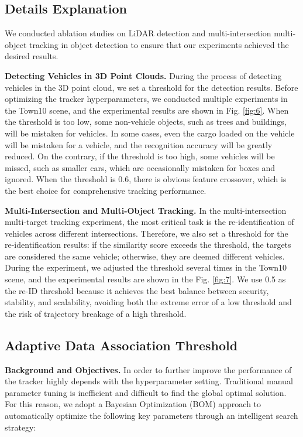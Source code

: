 \documentclass[lettersize,journal]{IEEEtran}
\begin{document}
\subsection{Details Explanation}

We conducted ablation studies on LiDAR detection and multi-intersection multi-object tracking in object detection to ensure that our experiments achieved the desired results.

\textbf{Detecting Vehicles in 3D Point Clouds.}
During the process of detecting vehicles in the 3D point cloud, we set a threshold for the detection results.
Before optimizing the tracker hyperparameters, we conducted multiple experiments in the Town10 scene, and the experimental results are shown in Fig. \ref{fig:6}.
When the threshold is too low, some non-vehicle objects, such as trees and buildings, will be mistaken for vehicles. In some cases, even the cargo loaded on the vehicle will be mistaken for a vehicle, and the recognition accuracy will be greatly reduced.
On the contrary, if the threshold is too high, some vehicles will be missed, such as smaller cars, which are occasionally mistaken for boxes and ignored.
When the threshold is 0.6, there is obvious feature crossover, which is the best choice for comprehensive tracking performance.

\textbf{Multi-Intersection and Multi-Object Tracking.}
In the multi-intersection multi-target tracking experiment, the most critical task is the re-identification of vehicles across different intersections. 
Therefore, we also set a threshold for the re-identification results: if the similarity score exceeds the threshold, the targets are considered the same vehicle; otherwise, they are deemed different vehicles. 
During the experiment, we adjusted the threshold several times in the Town10 scene, and the experimental results are shown in the Fig. \ref{fig:7}.
We use 0.5 as the re-ID threshold because it achieves the best balance between security, stability, and scalability, avoiding both the extreme error of a low threshold and the risk of trajectory breakage of a high threshold.

\subsection{Adaptive Data Association Threshold}

\textbf{Background and Objectives.}
In order to further improve the performance of the tracker highly depends with the hyperparameter setting. 
Traditional manual parameter tuning is inefficient and difficult to find the global optimal solution. 
For this reason, we adopt a Bayesian Optimization (BOM) approach to automatically optimize the following key parameters through an intelligent search strategy:
\end{document}
